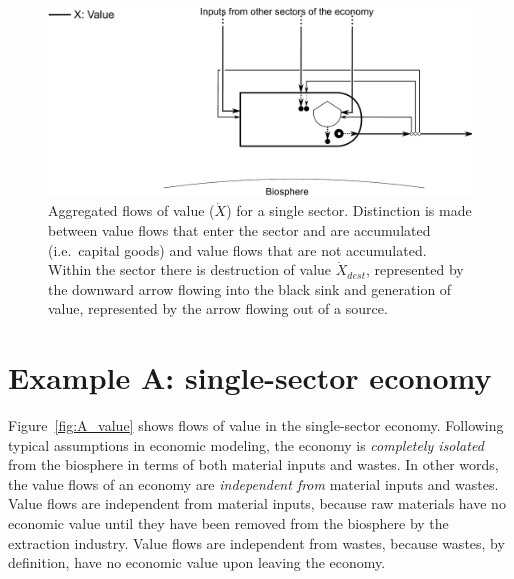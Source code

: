 \begin{figure}[!ht]
\centering
\includegraphics[width=\linewidth]{Part_2/Chapter_Values/images/PERKS_basic_unit_value.pdf}
\caption[Aggregated flows of value for a single sector]{Aggregated flows of value ($\dot{X}$) 
for a single sector. 
Distinction is made between value flows that 
enter the sector and are accumulated (i.e.\ capital goods) 
and value flows that are not accumulated. 
Within the sector there is destruction of value $\dot{X}_{dest}$, 
represented by the downward arrow flowing 
into the black sink and generation of value, 
represented by the arrow flowing out of a source. }
\label{fig:basic_value_aggregated} 
\end{figure}


\section{Example A: single-sector economy} %
\label{sec:value_example_A}

Figure~\ref{fig:A_value} shows flows of value in the single-sector economy.
Following typical assumptions in economic modeling, 
the economy is \emph{completely isolated} from the biosphere
in terms of both material inputs and wastes.
In other words, the value flows of an economy are \emph{independent from}
material inputs and wastes.
Value flows are independent from material inputs,
because raw materials have no economic value 
until they have been removed from the biosphere by the extraction industry.
Value flows are independent from wastes,
because wastes, by definition, have no economic value 
upon leaving the economy.

